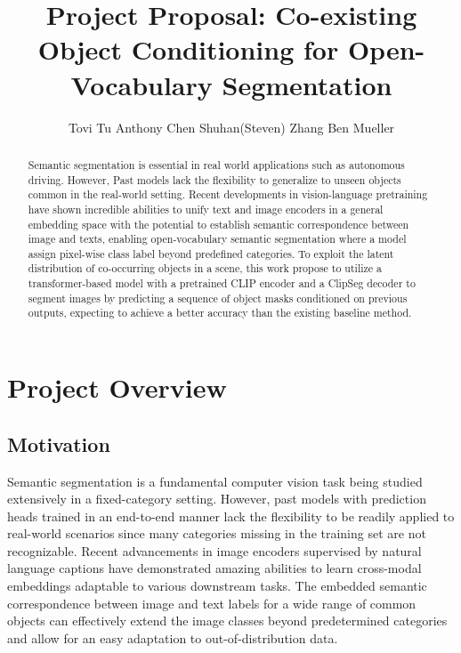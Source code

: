 \documentclass[10pt,twocolumn,letterpaper]{article}
\begin{document}
\title{Project Proposal: Co-existing Object Conditioning for Open-Vocabulary Segmentation}

\author{
Tovi Tu \hspace{1in} Anthony Chen \hspace{1in} Shuhan(Steven) Zhang  \hspace{1in} Ben Mueller 
}
\maketitle

\begin{abstract}
Semantic segmentation is essential in real world applications such as autonomous driving. However, Past models lack the flexibility to generalize to unseen objects common in the real-world setting. Recent developments in vision-language pretraining have shown incredible abilities to unify text and image encoders in a general embedding space with the potential to establish semantic correspondence between image and texts, enabling open-vocabulary semantic segmentation where a model assign pixel-wise class label beyond predefined categories. To exploit the latent distribution of co-occurring objects in a scene, this work propose to utilize a transformer-based model with a pretrained CLIP encoder and a ClipSeg decoder to segment images by predicting a sequence of object masks conditioned on previous outputs, expecting to achieve a better accuracy than the existing baseline method.

\end{abstract}

\section{Project Overview}

\subsection{Motivation}

Semantic segmentation is a fundamental computer vision task being studied extensively in a fixed-category setting. However, past models with prediction heads trained in an end-to-end manner lack the flexibility to be readily applied to real-world scenarios since many categories missing in the training set are not recognizable. Recent advancements in image encoders supervised by natural language captions have demonstrated amazing abilities to learn cross-modal embeddings adaptable to various downstream tasks. The embedded semantic correspondence between image and text labels for a wide range of common objects can effectively extend the image classes beyond predetermined categories and allow for an easy adaptation to out-of-distribution data. 
\end{document}

